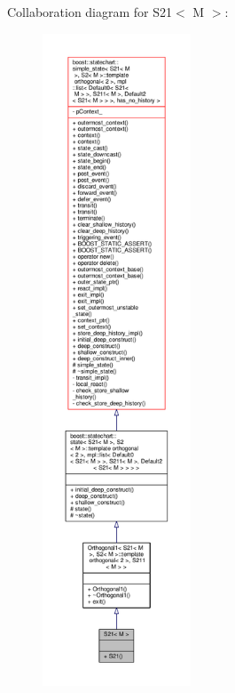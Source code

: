 Collaboration diagram for S21$<$ M $>$\+:
\nopagebreak
\begin{figure}[H]
\begin{center}
\leavevmode
\includegraphics[height=550pt]{struct_s21__coll__graph}
\end{center}
\end{figure}
